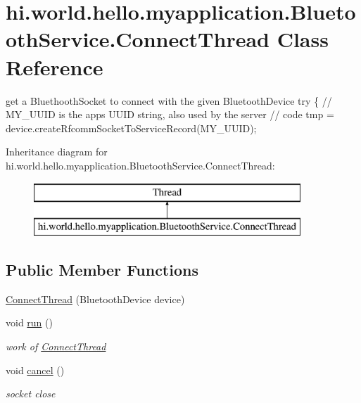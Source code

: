 \hypertarget{classhi_1_1world_1_1hello_1_1myapplication_1_1_bluetooth_service_1_1_connect_thread}{}\section{hi.\+world.\+hello.\+myapplication.\+Bluetooth\+Service.\+Connect\+Thread Class Reference}
\label{classhi_1_1world_1_1hello_1_1myapplication_1_1_bluetooth_service_1_1_connect_thread}


get a Bluethooth\+Socket to connect with the given Bluetooth\+Device try \{ // M\+Y\+\_\+\+U\+U\+ID is the app\textquotesingle{}s U\+U\+ID string, also used by the server // code tmp = device.\+create\+Rfcomm\+Socket\+To\+Service\+Record(\+M\+Y\+\_\+\+U\+U\+I\+D);  


Inheritance diagram for hi.\+world.\+hello.\+myapplication.\+Bluetooth\+Service.\+Connect\+Thread\+:\begin{figure}[H]
\begin{center}
\leavevmode
\includegraphics[height=2.000000cm]{classhi_1_1world_1_1hello_1_1myapplication_1_1_bluetooth_service_1_1_connect_thread}
\end{center}
\end{figure}
\subsection*{Public Member Functions}
\begin{DoxyCompactItemize}
\item 
\mbox{\hyperlink{classhi_1_1world_1_1hello_1_1myapplication_1_1_bluetooth_service_1_1_connect_thread_a2866179d3664e57d54430d8e044f052d}{Connect\+Thread}} (Bluetooth\+Device device)
\item 
void \mbox{\hyperlink{classhi_1_1world_1_1hello_1_1myapplication_1_1_bluetooth_service_1_1_connect_thread_ab0dea074c4beed9a3ea24a52225a6f65}{run}} ()
\begin{DoxyCompactList}\small\item\em work of \mbox{\hyperlink{classhi_1_1world_1_1hello_1_1myapplication_1_1_bluetooth_service_1_1_connect_thread}{Connect\+Thread}} \end{DoxyCompactList}\item 
void \mbox{\hyperlink{classhi_1_1world_1_1hello_1_1myapplication_1_1_bluetooth_service_1_1_connect_thread_a620b62ac8b8d35cdd9805ce43b1ccae2}{cancel}} ()
\begin{DoxyCompactList}\small\item\em socket close \end{DoxyCompactList}\end{DoxyCompactItemize}
